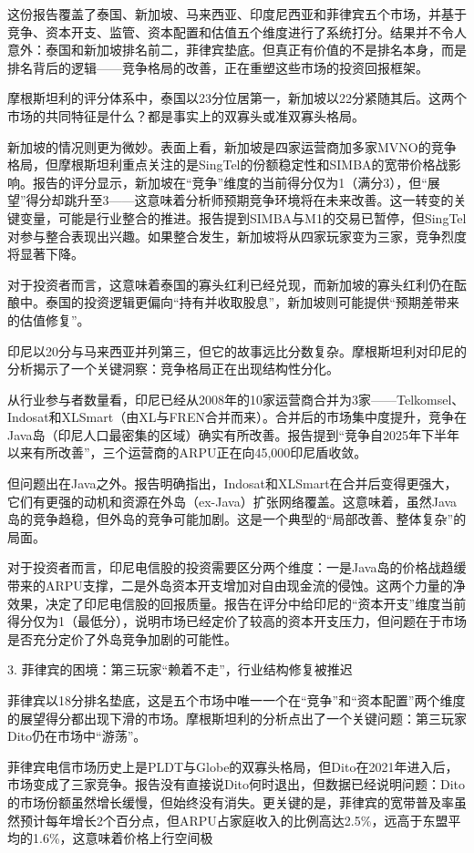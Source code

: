 \documentclass[11pt]{ctexart}
\begin{document}
这份报告覆盖了泰国、新加坡、马来西亚、印度尼西亚和菲律宾五个市场，并基于竞争、资本开支、监管、资本配置和估值五个维度进行了系统打分。结果并不令人意外：泰国和新加坡排名前二，菲律宾垫底。但真正有价值的不是排名本身，而是排名背后的逻辑——竞争格局的改善，正在重塑这些市场的投资回报框架。

摩根斯坦利的评分体系中，泰国以23分位居第一，新加坡以22分紧随其后。这两个市场的共同特征是什么？都是事实上的双寡头或准双寡头格局。

新加坡的情况则更为微妙。表面上看，新加坡是四家运营商加多家MVNO的竞争格局，但摩根斯坦利重点关注的是SingTel的份额稳定性和SIMBA的宽带价格战影响。报告的评分显示，新加坡在“竞争”维度的当前得分仅为1（满分3），但“展望”得分却跳升至3——这意味着分析师预期竞争环境将在未来改善。这一转变的关键变量，可能是行业整合的推进。报告提到SIMBA与M1的交易已暂停，但SingTel对参与整合表现出兴趣。如果整合发生，新加坡将从四家玩家变为三家，竞争烈度将显著下降。

对于投资者而言，这意味着泰国的寡头红利已经兑现，而新加坡的寡头红利仍在酝酿中。泰国的投资逻辑更偏向“持有并收取股息”，新加坡则可能提供“预期差带来的估值修复”。

印尼以20分与马来西亚并列第三，但它的故事远比分数复杂。摩根斯坦利对印尼的分析揭示了一个关键洞察：竞争格局正在出现结构性分化。

从行业参与者数量看，印尼已经从2008年的10家运营商合并为3家——Telkomsel、Indosat和XLSmart（由XL与FREN合并而来）。合并后的市场集中度提升，竞争在Java岛（印尼人口最密集的区域）确实有所改善。报告提到“竞争自2025年下半年以来有所改善”，三个运营商的ARPU正在向45,000印尼盾收敛。

但问题出在Java之外。报告明确指出，Indosat和XLSmart在合并后变得更强大，它们有更强的动机和资源在外岛（ex-Java）扩张网络覆盖。这意味着，虽然Java岛的竞争趋稳，但外岛的竞争可能加剧。这是一个典型的“局部改善、整体复杂”的局面。

对于投资者而言，印尼电信股的投资需要区分两个维度：一是Java岛的价格战趋缓带来的ARPU支撑，二是外岛资本开支增加对自由现金流的侵蚀。这两个力量的净效果，决定了印尼电信股的回报质量。报告在评分中给印尼的“资本开支”维度当前得分仅为1（最低分），说明市场已经定价了较高的资本开支压力，但问题在于市场是否充分定价了外岛竞争加剧的可能性。

3. 菲律宾的困境：第三玩家“赖着不走”，行业结构修复被推迟

菲律宾以18分排名垫底，这是五个市场中唯一一个在“竞争”和“资本配置”两个维度的展望得分都出现下滑的市场。摩根斯坦利的分析点出了一个关键问题：第三玩家Dito仍在市场中“游荡”。

菲律宾电信市场历史上是PLDT与Globe的双寡头格局，但Dito在2021年进入后，市场变成了三家竞争。报告没有直接说Dito何时退出，但数据已经说明问题：Dito的市场份额虽然增长缓慢，但始终没有消失。更关键的是，菲律宾的宽带普及率虽然预计每年增长2个百分点，但ARPU占家庭收入的比例高达2.5\%，远高于东盟平均的1.6\%，这意味着价格上行空间极
\end{document}
